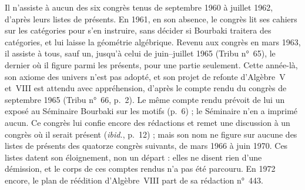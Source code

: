 \documentclass[11pt]{amsart}
\begin{document}
Il n'assiste à aucun des six congrès tenus de septembre 1960 à juillet 1962, d'après leurs listes de présents. En 1961, en son absence, le congrès lit ses cahiers sur les catégories pour s'en instruire, sans décider si Bourbaki traitera des catégories, et lui laisse la géométrie algébrique. Revenu aux congrès en mars 1963, il assiste à tous, sauf un, jusqu'à celui de juin--juillet 1965 (Tribu n°~65), le dernier où il figure parmi les présents, pour une partie seulement. Cette année-là, son axiome des univers n'est pas adopté, et son projet de refonte d'Algèbre~V et~VIII est attendu avec appréhension, d'après le compte rendu du congrès de septembre 1965 (Tribu n°~66, p.~2). Le même compte rendu prévoit de lui un exposé au Séminaire Bourbaki sur les motifs (p.~6) ; le Séminaire n'en a imprimé aucun. Ce congrès lui confie encore des rédactions et remet une discussion à un congrès où il serait présent (\emph{ibid.}, p.~12) ; mais son nom ne figure sur aucune des listes de présents des quatorze congrès suivants, de mars 1966 à juin 1970. Ces listes datent son éloignement, non un départ : elles ne disent rien d'une démission, et le corps de ces comptes rendus n'a pas été parcouru. En 1972 encore, le plan de réédition d'Algèbre~VIII part de sa rédaction n°~443.
\end{document}
